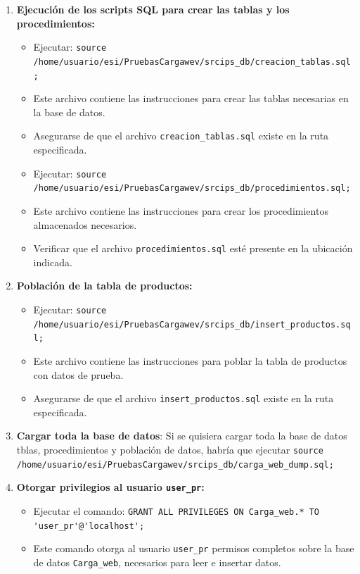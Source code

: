 \documentclass[10pt]{book}
\begin{document}
\begin{enumerate}
        \item \textbf{Ejecución de los scripts SQL para crear las tablas y los procedimientos:}
        \begin{itemize}
            \item Ejecutar: \lstinline{source /home/usuario/esi/PruebasCargawev/srcips_db/creacion_tablas.sql;}
            \item Este archivo contiene las instrucciones para crear las tablas necesarias en la base de datos.
            \item Asegurarse de que el archivo \texttt{creacion\_tablas.sql} existe en la ruta especificada.
            
            \item Ejecutar: \lstinline{source /home/usuario/esi/PruebasCargawev/srcips_db/procedimientos.sql;}
            \item Este archivo contiene las instrucciones para crear los procedimientos almacenados necesarios.
            \item Verificar que el archivo \texttt{procedimientos.sql} esté presente en la ubicación indicada.
        \end{itemize}
        
        \item \textbf{Población de la tabla de productos:}
        \begin{itemize}
            \item Ejecutar: \lstinline{source /home/usuario/esi/PruebasCargawev/srcips_db/insert_productos.sql;}
            \item Este archivo contiene las instrucciones para poblar la tabla de productos con datos de prueba.
            \item Asegurarse de que el archivo \texttt{insert\_productos.sql} existe en la ruta especificada.
        \end{itemize}
        \item \textbf{Cargar toda la base de datos}: Si se quisiera cargar toda la base de datos tblas, procedimientos y población de datos, habría que ejecutar  \lstinline{source /home/usuario/esi/PruebasCargawev/srcips_db/carga_web_dump.sql;}
        
        \item \textbf{Otorgar privilegios al usuario \texttt{user\_pr}:}
        \begin{itemize}
            \item Ejecutar el comando: \lstinline{GRANT ALL PRIVILEGES ON Carga_web.* TO 'user_pr'@'localhost';}
            \item Este comando otorga al usuario \texttt{user\_pr} permisos completos sobre la base de datos \texttt{Carga\_web}, necesarios para leer e insertar datos.
        \end{itemize}
    

\end{enumerate}
\end{document}
